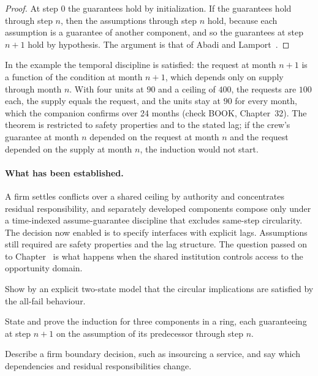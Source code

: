 \begin{proof}
At step $0$ the guarantees hold by initialization. If the guarantees hold through step $n$, then the assumptions through step $n$ hold, because each assumption is a guarantee of another component, and so the guarantees at step $n+1$ hold by hypothesis. The argument is that of Abadi and Lamport~\cite{abadi1995}.
\end{proof}

In the example the temporal discipline is satisfied: the request at month $n+1$ is a function of the condition at month $n+1$, which depends only on supply through month $n$. With four units at $90$ and a ceiling of $400$, the requests are $100$ each, the supply equals the request, and the units stay at $90$ for every month, which the companion confirms over 24 months (check BOOK, Chapter~32). The theorem is restricted to safety properties and to the stated lag; if the crew's guarantee at month $n$ depended on the request at month $n$ and the request depended on the supply at month $n$, the induction would not start.

\paragraph{What has been established.} A firm settles conflicts over a shared ceiling by authority and concentrates residual responsibility, and separately developed components compose only under a time-indexed assume-guarantee discipline that excludes same-step circularity. The decision now enabled is to specify interfaces with explicit lags. Assumptions still required are safety properties and the lag structure. The question passed on to Chapter~ is what happens when the shared institution controls access to the opportunity domain.

\begin{exercise}
Show by an explicit two-state model that the circular implications are satisfied by the all-fail behaviour.
\end{exercise}
\begin{exercise}
State and prove the induction for three components in a ring, each guaranteeing at step $n+1$ on the assumption of its predecessor through step $n$.
\end{exercise}
\begin{exercise}
Describe a firm boundary decision, such as insourcing a service, and say which dependencies and residual responsibilities change.
\end{exercise}

